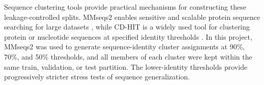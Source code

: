 Sequence clustering tools provide practical mechanisms for constructing these leakage-controlled splits. MMseqs2 enables sensitive and scalable protein sequence searching for large datasets \cite{steinegger2017mmseqs2}, while CD-HIT is a widely used tool for clustering protein or nucleotide sequences at specified identity thresholds \cite{li2006cdhit}. In this project, MMseqs2 was used to generate sequence-identity cluster assignments at 90\%, 70\%, and 50\% thresholds, and all members of each cluster were kept within the same train, validation, or test partition. The lower-identity thresholds provide progressively stricter stress tests of sequence generalization.
